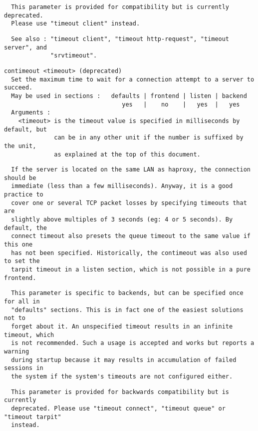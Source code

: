 \begin{verbatim}
  This parameter is provided for compatibility but is currently deprecated.
  Please use "timeout client" instead.
\end{verbatim}

\begin{verbatim}
  See also : "timeout client", "timeout http-request", "timeout server", and
             "srvtimeout".
\end{verbatim}

\begin{verbatim}
contimeout <timeout> (deprecated)
  Set the maximum time to wait for a connection attempt to a server to succeed.
  May be used in sections :   defaults | frontend | listen | backend
                                 yes   |    no    |   yes  |   yes
  Arguments :
    <timeout> is the timeout value is specified in milliseconds by default, but
              can be in any other unit if the number is suffixed by the unit,
              as explained at the top of this document.
\end{verbatim}

\begin{verbatim}
  If the server is located on the same LAN as haproxy, the connection should be
  immediate (less than a few milliseconds). Anyway, it is a good practice to
  cover one or several TCP packet losses by specifying timeouts that are
  slightly above multiples of 3 seconds (eg: 4 or 5 seconds). By default, the
  connect timeout also presets the queue timeout to the same value if this one
  has not been specified. Historically, the contimeout was also used to set the
  tarpit timeout in a listen section, which is not possible in a pure frontend.
\end{verbatim}

\begin{verbatim}
  This parameter is specific to backends, but can be specified once for all in
  "defaults" sections. This is in fact one of the easiest solutions not to
  forget about it. An unspecified timeout results in an infinite timeout, which
  is not recommended. Such a usage is accepted and works but reports a warning
  during startup because it may results in accumulation of failed sessions in
  the system if the system's timeouts are not configured either.
\end{verbatim}

\begin{verbatim}
  This parameter is provided for backwards compatibility but is currently
  deprecated. Please use "timeout connect", "timeout queue" or "timeout tarpit"
  instead.
\end{verbatim}

